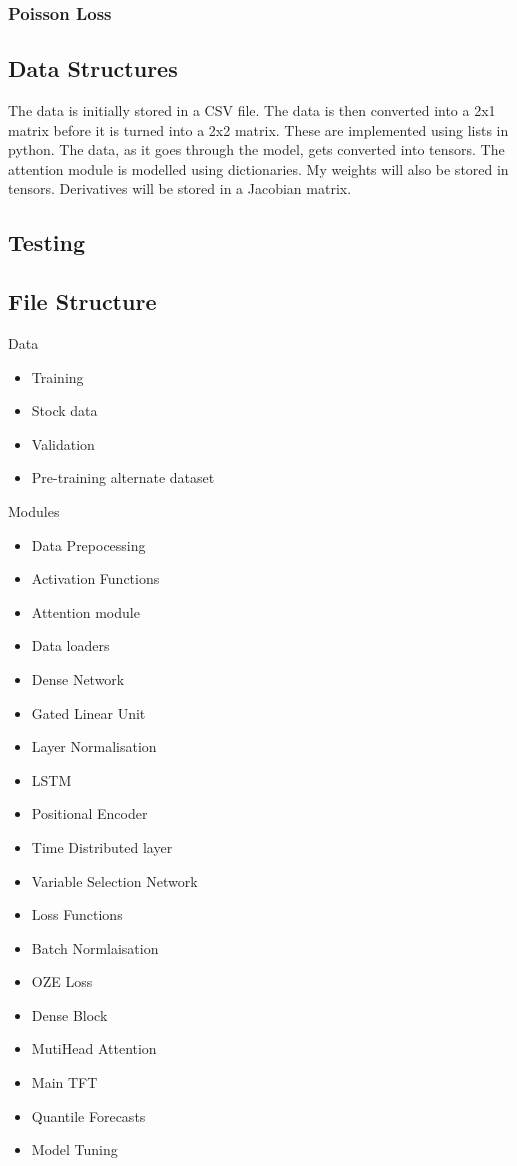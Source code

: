 \documentclass{article}
\begin{document}
\subsubsection{Poisson Loss}



\clearpage
\subsection{Data Structures}
The data is initially stored in a CSV file. The data is then converted into a 2x1 matrix before it is turned into a 2x2 matrix. These are implemented using lists in python. The data, as it goes through the model, gets converted into tensors.
The attention module is modelled using dictionaries.
My weights will also be stored in tensors.
Derivatives will be stored in a Jacobian matrix.
\clearpage


\subsection{Testing}







\subsection{File Structure}
Data
\begin{itemize}
\item Training
\item Stock data
\item Validation
\item Pre-training alternate dataset
\end{itemize}
Modules
\begin{itemize}
\item Data Prepocessing
\item Activation Functions
\item Attention module
\item Data loaders
\item Dense Network
\item Gated Linear Unit
\item Layer Normalisation
\item LSTM
\item Positional Encoder
\item Time Distributed layer
\item Variable Selection Network
\item Loss Functions
\item Batch Normlaisation
\item OZE Loss
\item Dense Block
\item MutiHead Attention
\item Main TFT
\item Quantile Forecasts
\item Model Tuning
\end{itemize}
\end{document}

